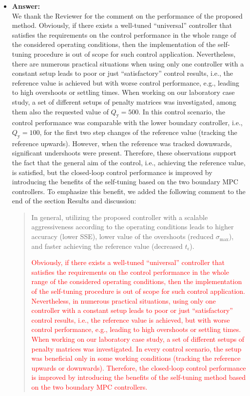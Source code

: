 \documentclass[a4paper,10pt]{article}
\newcommand{\change}[1]{\textcolor{red}{#1}}
\newcommand{\answer}[1]{
	\begin{itemize}
		\item[] \textbf{Answer:}\\ #1
	\end{itemize}
}
\begin{document}
	\answer{		
		We thank the Reviewer for the comment on the performance of the proposed method. Obviously, if there exists a well-tuned ``universal'' controller that satisfies the requirements on the control performance in the whole range of the considered operating conditions, then the implementation of the self-tuning procedure is out of scope for such control application. Nevertheless, there are numerous practical situations when using only one controller with a constant setup leads to poor or just ``satisfactory'' control results, i.e., the reference value is achieved but with worse control performance, e.g., leading to high overshoots or settling times. When working on our laboratory case study, a set of different setups of penalty matrices was investigated, among them also the requested value of $Q_\mathrm{y} = 500$. In this control scenario, the control performance was comparable with the lower boundary controller, i.e., $Q_\mathrm{y} = 100$, for the first two step changes of the reference value (tracking the reference upwards). However, when the reference was tracked downwards, significant undershoots were present. Therefore, these observations support the fact that the general aim of the control, i.e., achieving the reference value, is satisfied, but the closed-loop control performance is improved by introducing the benefits of the self-tuning based on the two boundary MPC controllers. To emphasize this benefit, we added the following comment to the end of the section Results and discussion: 
		\begin{quote}			
			In general, utilizing the proposed controller with a scalable aggressiveness according to the operating conditions leads to higher accuracy (lower SSE), lower value of the overshoots (reduced $\sigma_{\mathrm{max}}$), and faster achieving the reference value (decreased $t_{\epsilon}$).
			
			\change{Obviously, if there exists a well-tuned ``universal'' controller that satisfies the requirements on the control performance in the whole range of the considered operating conditions, then the implementation of the self-tuning procedure is out of scope for such control application. Nevertheless, in numerous practical situations, using only one controller with a constant setup leads to poor or just ``satisfactory'' control results, i.e., the reference value is achieved, but with worse control performance, e.g., leading to high overshoots or settling times. When working on our laboratory case study, a set of different setups of penalty matrices was investigated. In every control scenario, the setup was beneficial only in some working conditions (tracking the reference upwards or downwards). Therefore, the closed-loop control performance is improved by introducing the benefits of the self-tuning method based on the two boundary MPC controllers.}
		\end{quote}		
	}
\end{document}
